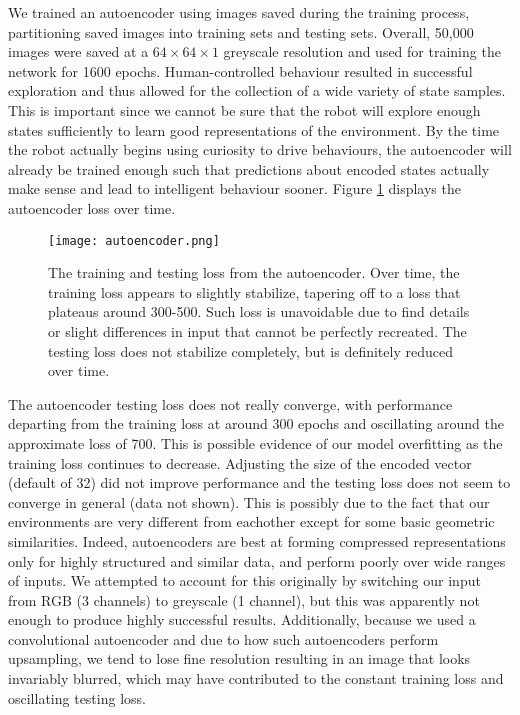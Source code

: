 \documentclass[conference, 12pt]{IEEEtran} %
\begin{document}
	\par We trained an autoencoder using images saved during the training process, partitioning saved images into training sets and testing sets. Overall, 50,000 images were saved at a $64 \times 64 \times 1$ greyscale resolution and used for training the network for 1600 epochs. Human-controlled behaviour resulted in successful exploration and thus allowed for the collection of a wide variety of state samples. This is important since we cannot be sure that the robot will explore enough states sufficiently to learn good representations of the environment. By the time the robot actually begins using curiosity to drive behaviours, the autoencoder will already be trained enough such that predictions about encoded states actually make sense and lead to intelligent behaviour sooner. Figure \ref{fig:autoencoder} displays the autoencoder loss over time.
	\begin{figure}[ht]
		\centering
		\texttt{[image: autoencoder.png]}
		\caption{The training and testing loss from the autoencoder. Over time, the training loss appears to slightly stabilize, tapering off to a loss that plateaus around 300-500. Such loss is unavoidable due to find details or slight differences in input that cannot be perfectly recreated. The testing loss does not stabilize completely, but is definitely reduced over time.}
		\label{fig:autoencoder}
	\end{figure}
	\par The autoencoder testing loss does not really converge, with performance departing from the training loss at around 300 epochs and oscillating around the approximate loss of 700. This is possible evidence of our model overfitting as the training loss continues to decrease. Adjusting the size of the encoded vector (default of 32) did not improve performance and the testing loss does not seem to converge in general (data not shown). This is possibly due to the fact that our environments are very different from eachother except for some basic geometric similarities. Indeed, autoencoders are best at forming compressed representations only for highly structured and similar data, and perform poorly over wide ranges of inputs. We attempted to account for this originally by switching our input from RGB (3 channels) to greyscale (1 channel), but this was apparently not enough to produce highly successful results. Additionally, because we used a convolutional autoencoder and due to how such autoencoders perform upsampling, we tend to lose fine resolution resulting in an image that looks invariably blurred, which may have contributed to the constant training loss and oscillating testing loss.
\end{document}

